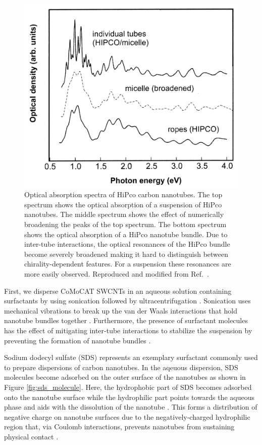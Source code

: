 \begin{figure}[ht]
	\centering
	\includegraphics[scale=1.2]{images/chapter_methods/cnt_rope_vs_micelle}
	\caption{Optical absorption spectra of HiPco carbon nanotubes. The top spectrum shows the optical absorption of a suspension of HiPco nanotubes. The middle spectrum shows the effect of numerically broadening the peaks of the top spectrum. The bottom spectrum shows the optical absorption of a HiPco nanotube bundle. Due to inter-tube interactions, the optical resonances of the HiPco bundle become severely broadened making it hard to distinguish between chirality-dependent features. For a suspension these resonances are more easily observed. Reproduced and modified from Ref.\ \cite{hagen2003quantitative}.}
	\label{fig:cnt_dispersion_vs_rope}
\end{figure}


First, we disperse CoMoCAT SWCNTs in an aqueous solution containing surfactants by using sonication followed by ultracentrifugation \cite{ichinose2017extraction}. Sonication uses mechanical vibrations to break up the van der Waals interactions that hold nanotube bundles together \cite{tkalya2012use}. Furthermore, the presence of surfactant molecules has the effect of mitigating inter-tube interactions to stabilize the suspension by preventing the formation of nanotube bundles \cite{vaisman2006role}.



Sodium dodecyl sulfate (SDS) represents an exemplary surfactant commonly used to prepare dispersions of carbon nanotubes. In the aqeuous dispersion, SDS molecules become adsorbed on the outer surface of the nanotubes as shown in Figure \ref{fig:sds_molecule}. Here, the hydrophobic part of SDS becomes adsorbed onto the nanotube surface while the hydrophilic part points towards the aqueous phase and aids with the dissolution of the nanotube \cite{richard2003supramolecular}. This forms a distribution of negative charge on nanotube surfaces due to the negatively-charged hydrophilic region that, via Coulomb interactions, prevents nanotubes from sustaining physical contact \cite{richard2003supramolecular}.

